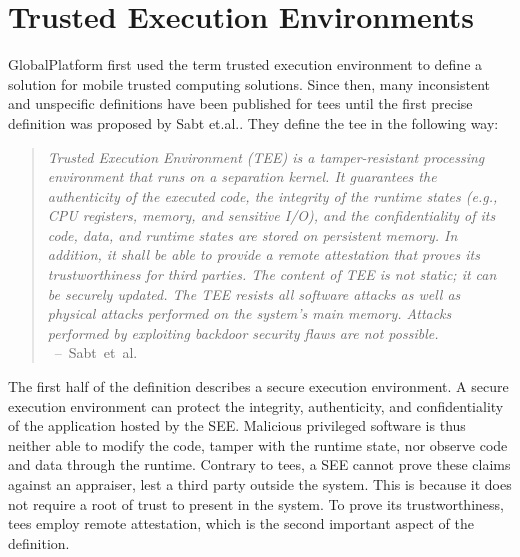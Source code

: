 \section{Trusted Execution Environments}
\label{sec:state:tee}
GlobalPlatform first used the term trusted execution environment to define a
solution for mobile trusted computing solutions.\cite{globaltee} Since then,
many inconsistent and unspecific definitions have been published for \glspl{tee}
until the first precise definition was proposed by Sabt
et.al.\cite{sabt2015trusted}. They define the \gls{tee} in the following way:
\begin{quote}
  \textit{Trusted Execution Environment (TEE) is a tamper-resistant processing
    environment that runs on a separation kernel. It guarantees the authenticity of
    the executed code, the integrity of the runtime states (e.g., CPU registers,
    memory, and sensitive I/O), and the confidentiality of its code, data, and
    runtime states are stored on persistent memory. In addition, it shall be able
    to provide a remote attestation that proves its trustworthiness for third
    parties. The content of TEE is not static; it can be securely updated. The TEE
    resists all software attacks as well as physical attacks performed on the
    system's main memory. Attacks performed by exploiting backdoor security flaws
    are not possible. \\
  } \mbox{ -- Sabt et al.\cite{sabt2015trusted}}
\end{quote}

The first half of the definition describes a secure execution environment. A
secure execution environment can protect the integrity, authenticity, and
confidentiality of the application hosted by the SEE. Malicious privileged
software is thus neither able to modify the code, tamper with the runtime state,
nor observe code and data through the runtime. Contrary to \glspl{tee}, a SEE
cannot prove these claims against an appraiser, lest a third party outside the
system. This is because it does not require a root of trust to present in the
system. To prove its trustworthiness, \glspl{tee} employ remote attestation,
which is the second important aspect of the definition.\\

